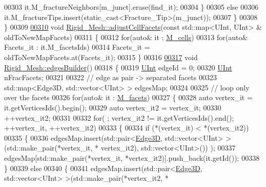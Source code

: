 \begin{DoxyCode}
00303             it.M\_fractureNeighbors[m\_junct].erase(find\_it);
00304         \}
00305         \textcolor{keywordflow}{else}
00306             it.M\_fractureTips.insert(static\_cast<Fracture\_Tip>(m\_junct));
00307     \}
00308 \}
00309 
\hypertarget{RigidMesh_8cpp_source.tex_l00310}{}\hyperlink{classFVCode3D_1_1Rigid__Mesh_a24c847643d9dc98dc3e7b2435e22cdf6}{00310} \textcolor{keywordtype}{void} \hyperlink{classFVCode3D_1_1Rigid__Mesh_a24c847643d9dc98dc3e7b2435e22cdf6}{Rigid\_Mesh::adjustCellFacets}(\textcolor{keyword}{const} std::map<UInt, UInt> & 
      oldToNewMapFacets)
00311 \{
00312     \textcolor{keywordflow}{for}(\textcolor{keyword}{auto}& it : \hyperlink{classFVCode3D_1_1Rigid__Mesh_ad19dc70b4efddafb6e8d8d4980bd23d6}{M\_cells})
00313         \textcolor{keywordflow}{for}(\textcolor{keyword}{auto}& Facets\_it : it.M\_facetsIds)
00314             Facets\_it = oldToNewMapFacets.at(Facets\_it);
00315 \}
00316 
\hypertarget{RigidMesh_8cpp_source.tex_l00317}{}\hyperlink{classFVCode3D_1_1Rigid__Mesh_aaceb00b0d75dee23a330033d46f592c7}{00317} \textcolor{keywordtype}{void} \hyperlink{classFVCode3D_1_1Rigid__Mesh_aaceb00b0d75dee23a330033d46f592c7}{Rigid\_Mesh::edgesBuilder}()
00318 \{
00319     \hyperlink{namespaceFVCode3D_a4bf7e328c75d0fd504050d040ebe9eda}{UInt} edgeId = 0;
00320     \hyperlink{namespaceFVCode3D_a4bf7e328c75d0fd504050d040ebe9eda}{UInt} nFracFacets;
00321 
00322     \textcolor{comment}{// edge as pair -> separated facets}
00323     std::map<Edge3D, std::vector<UInt> > edgesMap;
00324 
00325     \textcolor{comment}{// loop only over the facets}
00326     \textcolor{keywordflow}{for}(\textcolor{keyword}{auto}& it : \hyperlink{classFVCode3D_1_1Rigid__Mesh_a62757eb1d9c54b4421880b3c271b4c3b}{M\_facets})
00327     \{
00328         \textcolor{keyword}{auto} vertex\_it  = it.getVerticesIds().begin();
00329         \textcolor{keyword}{auto} vertex\_it2 = vertex\_it;
00330         ++vertex\_it2;
00331 
00332         \textcolor{keywordflow}{for}( ; vertex\_it2 != it.getVerticesIds().end(); ++vertex\_it, ++vertex\_it2)
00333         \{
00334             \textcolor{keywordflow}{if} (*(vertex\_it) < *(vertex\_it2))
00335             \{
00336                 edgesMap.insert(std::pair<\hyperlink{classFVCode3D_1_1Rigid__Mesh_a396039ac2943822c4652967ce1849c9f}{Edge3D}, std::vector<UInt> >(std::make\_pair(*vertex\_it, *
      vertex\_it2), std::vector<UInt>()) );
00337                 edgesMap[std::make\_pair(*vertex\_it, *vertex\_it2)].push\_back(it.getId());
00338             \}
00339             \textcolor{keywordflow}{else}
00340             \{
00341                 edgesMap.insert(std::pair<\hyperlink{classFVCode3D_1_1Rigid__Mesh_a396039ac2943822c4652967ce1849c9f}{Edge3D}, std::vector<UInt> >(std::make\_pair(*vertex\_it2, *

\end{DoxyCode}
